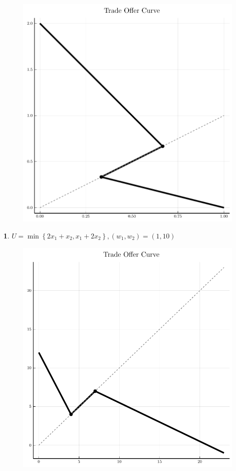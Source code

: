 \documentclass{article}
\theoremstyle{definition}
\newtheorem{subproblem}{}[problem]
\begin{document}
\begin{figure}[h]
    \centering
    \includegraphics[width=.6\linewidth]{Problem_Set_3_files/offer2.pdf}
    \label{fig:ex2_2}
\end{figure}
\newpage
\begin{subproblem}
$U=\min \left\{2 x_{1}+x_{2}, x_{1}+2 x_{2}\right\},\left(w_{1}, w_{2}\right)=(1,10)$
\end{subproblem}

\begin{figure}[h]
    \centering
    \includegraphics[width=.6\linewidth]{Problem_Set_3_files/offer3.pdf}
    \label{fig:ex2_2}
\end{figure}
\end{document}

